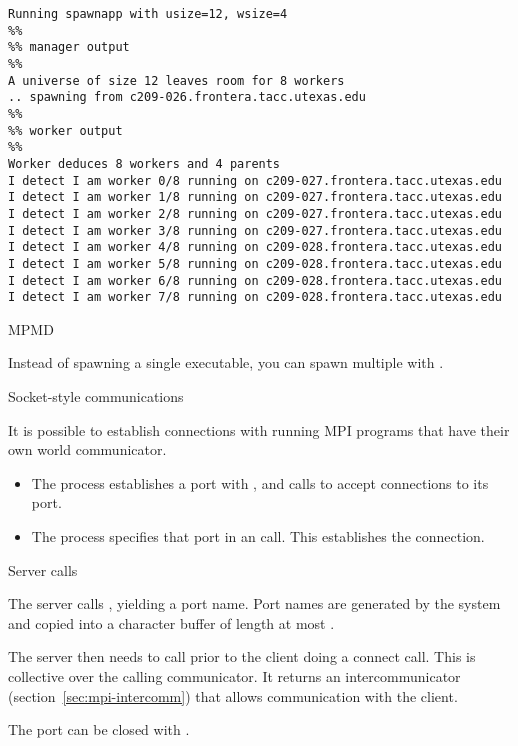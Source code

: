 \begin{verbatim}
Running spawnapp with usize=12, wsize=4
%%
%% manager output
%%
A universe of size 12 leaves room for 8 workers
.. spawning from c209-026.frontera.tacc.utexas.edu
%%
%% worker output
%%
Worker deduces 8 workers and 4 parents
I detect I am worker 0/8 running on c209-027.frontera.tacc.utexas.edu
I detect I am worker 1/8 running on c209-027.frontera.tacc.utexas.edu
I detect I am worker 2/8 running on c209-027.frontera.tacc.utexas.edu
I detect I am worker 3/8 running on c209-027.frontera.tacc.utexas.edu
I detect I am worker 4/8 running on c209-028.frontera.tacc.utexas.edu
I detect I am worker 5/8 running on c209-028.frontera.tacc.utexas.edu
I detect I am worker 6/8 running on c209-028.frontera.tacc.utexas.edu
I detect I am worker 7/8 running on c209-028.frontera.tacc.utexas.edu
\end{verbatim}

 {MPMD}

Instead of spawning a single executable, you can spawn multiple with
.

 {Socket-style communications}

It is possible to establish connections with running MPI programs that
have their own world communicator.
\begin{itemize}
\item The  process establishes a port with 
  , and calls  to accept
  connections to its port.
\item The  process specifies that port 
  in an  call. This establishes the connection.
\end{itemize}

 {Server calls}

The server calls , yielding a port name.
Port names are generated by the system and copied into a character
buffer of length at most .

The server then needs to call 
 prior to the client doing a connect call.
This is collective over the calling communicator.
It returns an intercommunicator (section~\ref{sec:mpi-intercomm})
that allows communication with the client.


The port can be closed with 
.

